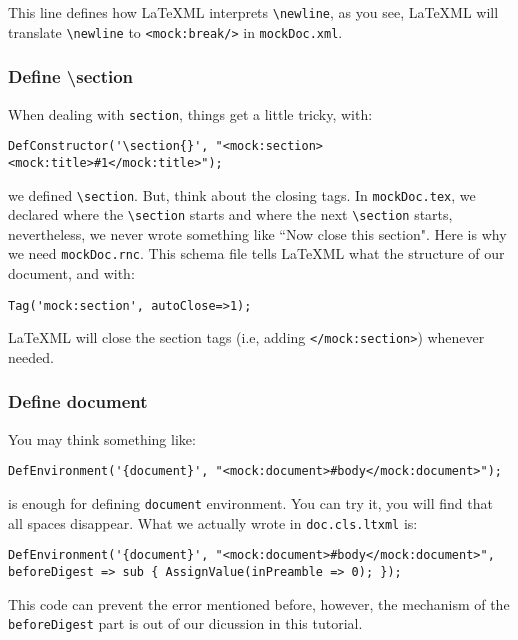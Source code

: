 \documentclass[a4paper]{article}
\begin{document}
 This line defines how \LaTeX ML interprets \texttt{\textbackslash newline}, as you see, \LaTeX ML will translate \texttt{\textbackslash newline} to \texttt{<mock:break/>} in \texttt{mockDoc.xml}.\\

\subsubsection{Define \textbackslash section}
 When dealing with \texttt{section}, things get a little tricky, with:
\begin{lstlisting}
DefConstructor('\section{}', "<mock:section><mock:title>#1</mock:title>");
\end{lstlisting}
we defined \texttt{\textbackslash section}. But, think about the closing tags. In \texttt{mockDoc.tex}, we declared where the \texttt{\textbackslash section} starts and where the next \texttt{\textbackslash section} starts, nevertheless, we never wrote something like ``Now close this section". Here is why we need \texttt{mockDoc.rnc}. This schema file tells \LaTeX ML what the structure of our document, and with:
\begin{lstlisting}
Tag('mock:section', autoClose=>1);
\end{lstlisting}
\LaTeX ML will close the section tags (i.e, adding \texttt{</mock:section>}) whenever needed. \\

\subsubsection{Define document}
You may think something like:
\begin{lstlisting}
DefEnvironment('{document}', "<mock:document>#body</mock:document>");
\end{lstlisting}
is enough for defining \texttt{document} environment. You can try it, you will find that all spaces disappear. What we actually wrote in \texttt{doc.cls.ltxml} is:
\begin{lstlisting}
DefEnvironment('{document}', "<mock:document>#body</mock:document>", beforeDigest => sub { AssignValue(inPreamble => 0); });
\end{lstlisting}
This code can prevent the error mentioned before, however, the mechanism of the \texttt{beforeDigest} part is out of our dicussion in this tutorial.\\
\end{document}
